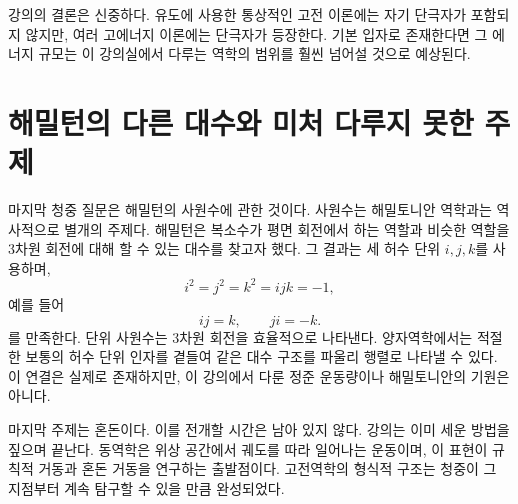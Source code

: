 \begin{classroomqa}
\end{classroomqa}

강의의 결론은 신중하다. 유도에 사용한 통상적인 고전 이론에는 자기 단극자가 포함되지 않지만, 여러 고에너지 이론에는 단극자가 등장한다. 기본 입자로 존재한다면 그 에너지 규모는 이 강의실에서 다루는 역학의 범위를 훨씬 넘어설 것으로 예상된다.

\section{해밀턴의 다른 대수와 미처 다루지 못한 주제}

마지막 청중 질문은 해밀턴의 사원수에 관한 것이다. 사원수는 해밀토니안 역학과는 역사적으로 별개의 주제다. 해밀턴은 복소수가 평면 회전에서 하는 역할과 비슷한 역할을 3차원 회전에 대해 할 수 있는 대수를 찾고자 했다. 그 결과는 세 허수 단위 \(i,j,k\)를 사용하며,
\begin{equation}
  i^2=j^2=k^2=ijk=-1,
\end{equation}
예를 들어
\begin{equation}
  ij=k,
  \qquad
  ji=-k.
\end{equation}
를 만족한다. 단위 사원수는 3차원 회전을 효율적으로 나타낸다. 양자역학에서는 적절한 보통의 허수 단위 인자를 곁들여 같은 대수 구조를 파울리 행렬로 나타낼 수 있다. 이 연결은 실제로 존재하지만, 이 강의에서 다룬 정준 운동량이나 해밀토니안의 기원은 아니다.

마지막 주제는 혼돈이다. 이를 전개할 시간은 남아 있지 않다. 강의는 이미 세운 방법을 짚으며 끝난다. 동역학은 위상 공간에서 궤도를 따라 일어나는 운동이며, 이 표현이 규칙적 거동과 혼돈 거동을 연구하는 출발점이다. 고전역학의 형식적 구조는 청중이 그 지점부터 계속 탐구할 수 있을 만큼 완성되었다.

